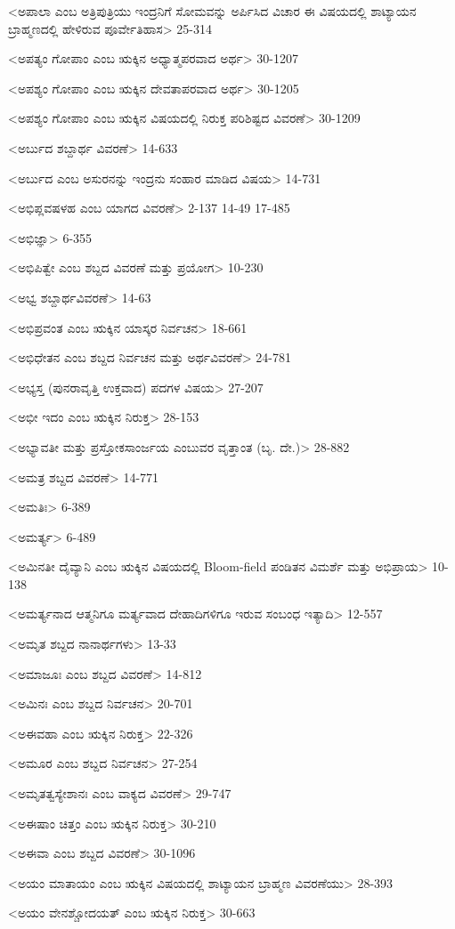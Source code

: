 <ಅಪಾಲಾ ಎಂಬ ಅತ್ರಿಪುತ್ರಿಯು ಇಂದ್ರನಿಗೆ ಸೋಮವನ್ನು ಅರ್ಪಿಸಿದ ವಿಚಾರ ಈ ವಿಷಯದಲ್ಲಿ ಶಾಟ್ಯಾಯನ ಬ್ರಾಹ್ಮಣದಲ್ಲಿ ಹೇಳಿರುವ ಪೂರ್ವೇತಿಹಾಸ>
25-314

<ಅಪತ್ಯಂ ಗೋಪಾಂ ಎಂಬ ಋಕ್ಕಿನ ಅಧ್ಯಾತ್ಮಪರವಾದ ಅರ್ಥ>
30-1207

<ಅಪಶ್ಯಂ ಗೋಪಾಂ ಎಂಬ ಋಕ್ಕಿನ ದೇವತಾಪರವಾದ ಅರ್ಥ>
30-1205

<ಅಪಶ್ಯಂ ಗೋಪಾಂ ಎಂಬ ಋಕ್ಕಿನ ವಿಷಯದಲ್ಲಿ ನಿರುಕ್ತ ಪರಿಶಿಷ್ಟದ ವಿವರಣೆ>
30-1209

<ಅರ್ಬುದ ಶಬ್ದಾರ್ಥ ವಿವರಣೆ>
14-633

<ಅರ್ಬುದ ಎಂಬ ಅಸುರನನ್ನು ಇಂದ್ರನು ಸಂಹಾರ ಮಾಡಿದ ವಿಷಯ>
14-731

<ಅಭಿಪ್ಲವಷಳಹ ಎಂಬ ಯಾಗದ ವಿವರಣೆ>
2-137 
14-49
17-485

<ಅಭಿಜ್ಞಾ>
6-355

<ಅಭಿಪಿತ್ವೇ ಎಂಬ ಶಬ್ದದ ವಿವರಣೆ ಮತ್ತು ಪ್ರಯೋಗ>
10-230

<ಅಭ್ವ ಶಬ್ದಾರ್ಥವಿವರಣೆ>
14-63

<ಅಭಿಪ್ರವಂತ ಎಂಬ ಋಕ್ಕಿನ ಯಾಸ್ಕರ ನಿರ್ವಚನ>
18-661

<ಅಭಿಧೇತನ ಎಂಬ ಶಬ್ದದ ನಿರ್ವಚನ ಮತ್ತು ಅರ್ಥವಿವರಣೆ>
24-781

<ಅಭ್ಯಸ್ತ (ಪುನರಾವೃತ್ತಿ ಉಕ್ತವಾದ) ಪದಗಳ ವಿಷಯ>
27-207

<ಅಭೀ ಇದಂ ಎಂಬ ಋಕ್ಕಿನ ನಿರುಕ್ತ>
28-153


<ಅಭ್ಯಾವತೀ ಮತ್ತು ಪ್ರಸ್ತೋಕಸಾಂರ್ಜಯ ಎಂಬುವರ ವೃತ್ತಾಂತ (ಬೃ. ದೇ.)>
28-882

<ಅಮತ್ರ ಶಬ್ದದ ವಿವರಣೆ>
14-771

<ಅಮತಿಃ>
6-389

<ಅಮರ್ತ್ಯ>
6-489

<ಅಮಿನತೀ ದೈವ್ಯಾನಿ ಎಂಬ ಋಕ್ಕಿನ ವಿಷಯದಲ್ಲಿ Bloom-field ಪಂಡಿತನ ವಿಮರ್ಶೆ ಮತ್ತು ಅಭಿಪ್ರಾಯ>
10-138

<ಅಮರ್ತ್ಯನಾದ ಆತ್ಮನಿಗೂ ಮರ್ತ್ಯವಾದ ದೇಹಾದಿಗಳಿಗೂ ಇರುವ ಸಂಬಂಧ ಇತ್ಯಾದಿ>
12-557

<ಅಮೃತ ಶಬ್ದದ ನಾನಾರ್ಥಗಳು>
13-33

<ಅಮಾಜೂಃ ಎಂಬ ಶಬ್ದದ ವಿವರಣೆ>
14-812

<ಅಮಿನಃ ಎಂಬ ಶಬ್ದದ ನಿರ್ವಚನ>
20-701

<ಅಈವಹಾ ಎಂಬ ಋಕ್ಕಿನ ನಿರುಕ್ತ>
22-326

<ಅಮೂರ ಎಂಬ ಶಬ್ದದ ನಿರ್ವಚನ>
27-254

<ಅಮೃತತ್ವಸ್ಯೇಶಾನಃ ಎಂಬ ವಾಕ್ಯದ ವಿವರಣೆ>
29-747

<ಅಈಷಾಂ ಚಿತ್ತಂ ಎಂಬ ಋಕ್ಕಿನ ನಿರುಕ್ತ>
30-210

<ಅಈವಾ ಎಂಬ ಶಬ್ದದ ವಿವರಣೆ>
30-1096

<ಅಯಂ ಮಾತಾಯಂ ಎಂಬ ಋಕ್ಕಿನ ವಿಷಯದಲ್ಲಿ ಶಾಟ್ಯಾಯನ ಬ್ರಾಹ್ಮಣ ವಿವರಣೆಯು>
28-393

<ಅಯಂ ವೇನಶ್ಚೋದಯತ್‍ ಎಂಬ ಋಕ್ಕಿನ ನಿರುಕ್ತ>
30-663

